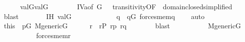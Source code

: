 \begin{isabellebody}
\ \ \ \ \isamarkupfalse%
\ {\isachardoublequoteopen}val{\isacharparenleft}{\kern0pt}G{\isacharcomma}{\kern0pt}{\isasymsigma}{\isacharparenright}{\kern0pt}{\isasymin}val{\isacharparenleft}{\kern0pt}G{\isacharcomma}{\kern0pt}{\isasymtau}{\isacharparenright}{\kern0pt}{\isachardoublequoteclose}\isanewline
\ \ \ \ \ \ \isamarkupfalse%
\ IV{}{}{}a{\isacharbrackleft}{\kern0pt}of\ G\ {\isasymsigma}\ {\isasymtau}{\isacharbrackright}{\kern0pt}\ transitivity{\isacharbrackleft}{\kern0pt}OF\ {\isacharunderscore}{\kern0pt}\ domain{\isacharunderscore}{\kern0pt}closed{\isacharbrackleft}{\kern0pt}simplified{\isacharbrackright}{\kern0pt}{\isacharbrackright}{\kern0pt}\ \isamarkupfalse%
\ blast\isanewline
\ \ \ \ \isamarkupfalse%
\ \isamarkupfalse%
\ IH\ {\isacartoucheopen}val{\isacharparenleft}{\kern0pt}G{\isacharcomma}{\kern0pt}{\isasymtau}{\isacharparenright}{\kern0pt}\ {\isacharequal}{\kern0pt}\ {\isacharunderscore}{\kern0pt}{\isacartoucheclose}\isanewline
\ \ \ \ \isamarkupfalse%
\isanewline
\ \ \ \ \isamarkupfalse%
\ q\ \ {\isachardoublequoteopen}q{\isasymin}G{\isachardoublequoteclose}\ {\isachardoublequoteopen}forces{\isacharunderscore}{\kern0pt}mem{\isacharparenleft}{\kern0pt}q{\isacharcomma}{\kern0pt}\ {\isasymsigma}{\isacharcomma}{\kern0pt}\ {\isasymtheta}{\isacharparenright}{\kern0pt}{\isachardoublequoteclose}\ \isamarkupfalse%
\ auto\isanewline
\ \ \ \ \isamarkupfalse%
\ \isamarkupfalse%
\ this\ \ {\isacartoucheopen}p{\isasymin}G{\isacartoucheclose}\ {\isacartoucheopen}M{\isacharunderscore}{\kern0pt}generic{\isacharparenleft}{\kern0pt}G{\isacharparenright}{\kern0pt}{\isacartoucheclose}\isanewline
\ \ \ \ \isamarkupfalse%
\ r\ \ {\isachardoublequoteopen}r{\isasymin}P{\isachardoublequoteclose}\ {\isachardoublequoteopen}r{\isasympreceq}p{\isachardoublequoteclose}\ {\isachardoublequoteopen}r{\isasympreceq}q{\isachardoublequoteclose}\isanewline
\ \ \ \ \ \ \isamarkupfalse%
\ blast\isanewline
\ \ \ \ \isamarkupfalse%
\isanewline
\ \ \ \ \isamarkupfalse%
\ {\isacartoucheopen}M{\isacharunderscore}{\kern0pt}generic{\isacharparenleft}{\kern0pt}G{\isacharparenright}{\kern0pt}{\isacartoucheclose}\isanewline
\ \ \ \ \isamarkupfalse%
\isanewline
\ \ \ \ \isamarkupfalse%
\ {\isachardoublequoteopen}forces{\isacharunderscore}{\kern0pt}mem{\isacharparenleft}{\kern0pt}r{\isacharcomma}{\kern0pt}\ {\isasymsigma}{\isacharcomma}{\kern0pt}\ {\isasymtheta}{\isacharparenright}{\kern0pt}{\isachardoublequoteclose}\isanewline

\end{isabellebody}
